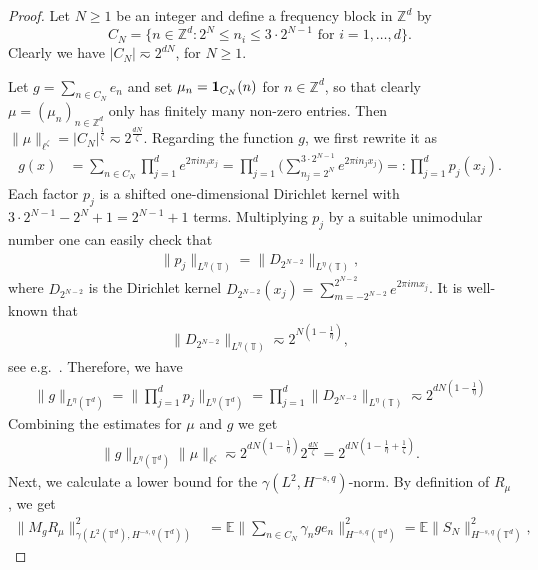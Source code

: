 \documentclass[reqno]{amsart}
\theoremstyle{plain}
\theoremstyle{remark}
\theoremstyle{plain}
\numberwithin{equation}{section}
\newcommand\bT{\mathbb{T}}
\newcommand\bZ{\mathbb{Z}}
\def\Z{{\mathbb Z}}
\newcommand{\E}{{\mathbb E}}
\newcommand{\T}{\mathbb{T}}
\newcommand{\one}{{{\bf 1}}}
\newcommand{\1}{\one}
\begin{document}
\begin{proof}
Let $N \geq 1$ be an integer and define a frequency block in $\Z^d$ by
$$
C_N = \{ n \in \Z^d : 2^N \leq n_i \leq 3 \cdot 2^{N-1} \text{ for } i=1, \dots, d \}.
$$
Clearly we have $|C_N|\eqsim 2^{dN}$, for $N\geq 1$.

Let $g = \sum_{n \in C_N} e_n$ and set $\mu_n = \one_{C_N}(n)$ for $n\in \bZ^d$, so that clearly $\mu = (\mu_n)_{n\in \bZ^d}$ only has finitely many non-zero entries. 
Then
$\|\mu\|_{\ell^\zeta} =  |C_N|^{\frac{1}{\zeta}} \eqsim 2^{\frac{dN}{\zeta}}$.
Regarding the function $g$, we first rewrite it as
\begin{align}
g(x) 
&= \sum_{n \in C_N} \prod_{j=1}^d e^{2\pi i n_j x_j} = \prod_{j=1}^d \Big( \sum_{n_j=2^N}^{3 \cdot 2^{N-1}} e^{2\pi i n_j x_j} \Big) =:\prod_{j=1}^d p_j(x_j).
\end{align}
Each factor $p_j$ is a shifted one-dimensional Dirichlet kernel with $3 \cdot 2^{N-1} - 2^N+1 = 2^{N-1}+1$ terms. 
Multiplying $p_j$ by a suitable unimodular number
one can easily check that 
\begin{align}
\|p_j\|_{L^\eta(\T)}= 
\|D_{2^{N-2}}\|_{L^\eta(\bT)},
\end{align}
where $D_{2^{N-2}}$ is the Dirichlet kernel $D_{2^{N-2}}(x_j) = \sum_{m =-2^{N-2}}^{2^{N-2}} e^{2\pi i m x_j}$. It is well-known that 
\begin{align}
\|D_{2^{N-2}}\|_{L^\eta(\T)}\eqsim 2^{N(1-\frac{1}{\eta})},
\end{align}
see e.g.\ \cite[Exercise 3.1.6]{Grafakos1}.
Therefore, we have
\begin{align}
\label{eq: g C_N norm}
\|g\|_{L^{\eta}(\T^d)} = \Big\| \prod_{j=1}^d p_j\Big\|_{L^\eta(\T^d)} = \prod_{j=1}^d \|D_{2^{N-2}}\|_{L^\eta(\T)} \eqsim 2^{dN(1-\frac{1}{\eta})}
\end{align}
Combining the estimates for $\mu$ and $g$ we get
\begin{align}
\label{eq: combined estimate g mu C_N}
\|g\|_{L^{\eta}(\T^d)} \|\mu\|_{\ell^\zeta} \eqsim 2^{dN(1-\frac{1}{\eta})}  2^{\frac{dN}{\zeta}} = 2^{dN(1 - \frac{1}{\eta} + \frac{1}{\zeta})}.
\end{align}
Next, we calculate a lower bound for the $\gamma(L^2,H^{-s,q})$-norm. By definition of $R_\mu$, we get
\begin{align}
\|M_g R_\mu\|_{\gamma(L^2(\T^d), H^{-s,q}(\T^d))}^2 &= \E \Big\| \sum_{n \in C_N} \gamma_n g e_n \Big\|_{H^{-s,q}(\T^d)}^2 
\label{eq: MgTmu C_N calculation 1}
= \E \| S_N \|_{H^{-s,q}(\T^d)}^2,
\end{align}

\end{proof}
\end{document}
